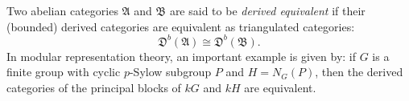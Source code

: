 Two abelian categories $\mathfrak{A}$ and $\mathfrak{B}$ are said to be {\it derived equivalent} if their (bounded) derived categories are equivalent as triangulated categories:
\[
\mathfrak{D}^b(\mathfrak{A}) \cong \mathfrak{D}^b(\mathfrak{B}).
\]
In modular representation theory, an important example is given by: if $G$ is a finite group with cyclic $p$-Sylow subgroup $P$ and $H = N_G(P)$, then the derived categories of the principal blocks of $kG$ and $kH$ are equivalent.
